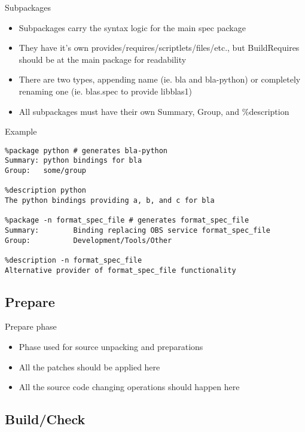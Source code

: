 \documentclass{beamer}
\begin{document}
\begin{frame}[t]{Subpackages}
	\begin{itemize}
	\item Subpackages carry the syntax logic for the main spec package
    \item They have it's own provides/requires/scriptlets/files/etc., but BuildRequires should be at the main package for readability
    \item There are two types, appending name (ie. bla and bla-python) or completely renaming one (ie. blas.spec to provide libblas1)
    \item All subpackages must have their own Summary, Group, and \%description
	\end{itemize}
\end{frame}

\begin{frame}[fragile]{Example}
	\begin{small}
	\begin{verbatim}
%package python # generates bla-python
Summary: python bindings for bla
Group:   some/group

%description python
The python bindings providing a, b, and c for bla

%package -n format_spec_file # generates format_spec_file
Summary:        Binding replacing OBS service format_spec_file
Group:          Development/Tools/Other

%description -n format_spec_file
Alternative provider of format_spec_file functionality
	\end{verbatim}
	\end{small}
\end{frame}

\subsection{Prepare}

\begin{frame}[t]{Prepare phase}
	\begin{itemize}
	\item Phase used for source unpacking and preparations
    \item All the patches should be applied here
    \item All the source code changing operations should happen here
	\end{itemize}
\end{frame}

\subsection{Build/Check}
\end{document}
